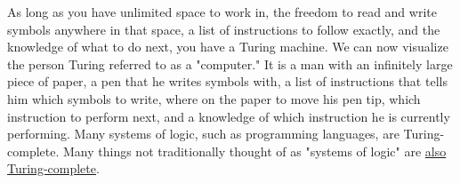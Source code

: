 As long as you have unlimited space to work in, the freedom to read and write symbols anywhere in that space, a list of instructions to follow exactly, and the knowledge of what to do next, you have a Turing machine. We can now visualize the person Turing referred to as a "computer." It is a man with an infinitely large piece of paper, a pen that he writes symbols with, a list of instructions that tells him which symbols to write, where on the paper to move his pen tip, which instruction to perform next, and a knowledge of which instruction he is currently performing. Many systems of logic, such as programming languages, are Turing-complete. Many things not traditionally thought of as "systems of logic" are \underline{also Turing-complete}. \\\\


